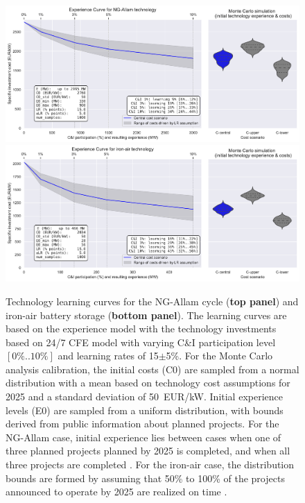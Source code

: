 \documentclass[pdflatex,sn-basic, Numbered]{sn-jnl}
\theoremstyle{thmstyleone}%
\theoremstyle{thmstyletwo}%
\theoremstyle{thmstylethree}%
\begin{document}
\begin{figure}[htbp]
    \centering
    \includegraphics[width=\textwidth]{images/e_curve_NG-Allam.pdf}
    \includegraphics[width=\textwidth]{images/e_curve_iron-air.pdf}
    \caption{Technology learning curves for the NG-Allam cycle (\textbf{top panel}) and iron-air battery storage (\textbf{bottom panel}).
    The learning curves are based on the experience model with the technology investments based on 24/7 CFE model with varying C\&I participation level $[0\%..10\%]$ and learning rates of 15$\pm$5\%.
    For the Monte Carlo analysis calibration, the initial costs (C0) are sampled from a normal distribution with a mean based on technology cost assumptions for 2025 and a standard deviation of 50~EUR/kW. Initial experience levels (E0) are sampled from a uniform distribution, with bounds derived from public information about planned projects. For the NG-Allam case, initial experience lies between cases when one of three planned projects planned by 2025 is completed, and when all three projects are completed \cite{BroadwingEnergyProject, CoyoteCleanPower, FrogLakeProject}. For the iron-air case, the distribution bounds are formed by assuming that 50\% to 100\% of the projects announced to operate by 2025 are realized on time \cite{FormEnergyLatest2024}.
    }
    \label{fig:panels}
\end{figure}
\end{document}
